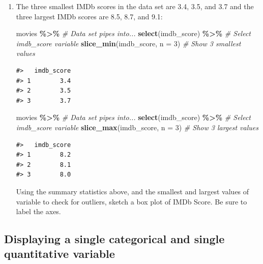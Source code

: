 \documentclass[
]{report}
\newenvironment{Shaded}{\begin{snugshade}}{\end{snugshade}}
\newcommand{\CommentTok}[1]{\textcolor[rgb]{0.56,0.35,0.01}{\textit{#1}}}
\newcommand{\DataTypeTok}[1]{\textcolor[rgb]{0.13,0.29,0.53}{#1}}
\newcommand{\DecValTok}[1]{\textcolor[rgb]{0.00,0.00,0.81}{#1}}
\newcommand{\KeywordTok}[1]{\textcolor[rgb]{0.13,0.29,0.53}{\textbf{#1}}}
\newcommand{\NormalTok}[1]{#1}
\newcommand{\OperatorTok}[1]{\textcolor[rgb]{0.81,0.36,0.00}{\textbf{#1}}}
\newcommand{\StringTok}[1]{\textcolor[rgb]{0.31,0.60,0.02}{#1}}
\begin{document}
\begin{enumerate}
\def\labelenumi{\arabic{enumi}.}
\setcounter{enumi}{10}
\item
  The three smallest IMDb scores in the data set are 3.4, 3.5, and 3.7 and the three largest IMDb scores are 8.5, 8.7, and 9.1:

\begin{Shaded}
\begin{Highlighting}[]
\NormalTok{movies }\OperatorTok{\%\textgreater{}\%}\StringTok{ }\CommentTok{\# Data set pipes into...}
\StringTok{  }\KeywordTok{select}\NormalTok{(imdb\_score) }\OperatorTok{\%\textgreater{}\%}\StringTok{ }\CommentTok{\# Select imdb\_score variable}
\StringTok{  }\KeywordTok{slice\_min}\NormalTok{(imdb\_score, }\DataTypeTok{n =} \DecValTok{3}\NormalTok{)  }\CommentTok{\# Show 3 smallest values}
\end{Highlighting}
\end{Shaded}

\begin{verbatim}
#>   imdb_score
#> 1        3.4
#> 2        3.5
#> 3        3.7
\end{verbatim}

  \newpage

\begin{Shaded}
\begin{Highlighting}[]
\NormalTok{movies }\OperatorTok{\%\textgreater{}\%}\StringTok{ }\CommentTok{\# Data set pipes into...}
\StringTok{  }\KeywordTok{select}\NormalTok{(imdb\_score) }\OperatorTok{\%\textgreater{}\%}\StringTok{ }\CommentTok{\# Select imdb\_score variable}
\StringTok{  }\KeywordTok{slice\_max}\NormalTok{(imdb\_score, }\DataTypeTok{n =} \DecValTok{3}\NormalTok{)  }\CommentTok{\# Show 3 largest values}
\end{Highlighting}
\end{Shaded}

\begin{verbatim}
#>   imdb_score
#> 1        8.2
#> 2        8.1
#> 3        8.0
\end{verbatim}

  Using the summary statistics above, and the smallest and largest values of variable to check for outliers, sketch a box plot of IMDb Score. Be sure to label the axes.
\end{enumerate}

\vspace{1.5in}

\hypertarget{displaying-a-single-categorical-and-single-quantitative-variable}{%
\subsection*{Displaying a single categorical and single quantitative variable}\label{displaying-a-single-categorical-and-single-quantitative-variable}}
\end{document}
